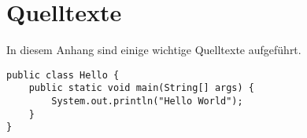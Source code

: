 \chapter{Quelltexte}

In diesem Anhang sind einige wichtige Quelltexte aufgeführt.

\begin{lstlisting}
public class Hello {
    public static void main(String[] args) {
        System.out.println("Hello World");
    }
}
\end{lstlisting}
